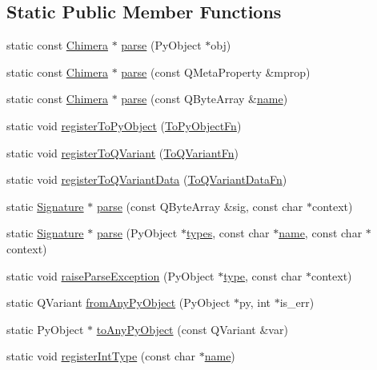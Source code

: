 \subsection*{Static Public Member Functions}
\begin{DoxyCompactItemize}
\item 
static const \hyperlink{classChimera}{Chimera} $\ast$ \hyperlink{classChimera_a9f1b5d0bca7b90c3e0cdb50c2fc9346e}{parse} (Py\+Object $\ast$obj)
\item 
static const \hyperlink{classChimera}{Chimera} $\ast$ \hyperlink{classChimera_adc43435c2b40bc5eea9d290f969beb68}{parse} (const Q\+Meta\+Property \&mprop)
\item 
static const \hyperlink{classChimera}{Chimera} $\ast$ \hyperlink{classChimera_acde081193b2c0ee1e2508b877a282ade}{parse} (const Q\+Byte\+Array \&\hyperlink{classChimera_a3f4fa9aed5e25294d82e861a451b8681}{name})
\item 
static void \hyperlink{classChimera_a452c8a5a4eaa0cdd3274368a07171e72}{register\+To\+Py\+Object} (\hyperlink{classChimera_a056918a401ce0fb2fc5f0b46a8eb6967}{To\+Py\+Object\+Fn})
\item 
static void \hyperlink{classChimera_af01d23e93c8a5a526de18489d44bfea7}{register\+To\+Q\+Variant} (\hyperlink{classChimera_aace3d67d11685db3bae5e5b2ee733cfb}{To\+Q\+Variant\+Fn})
\item 
static void \hyperlink{classChimera_aee1b6718d2efe602efd174bff6f9156a}{register\+To\+Q\+Variant\+Data} (\hyperlink{classChimera_a5c642e88eaf111610ca6e7c946bb2f7d}{To\+Q\+Variant\+Data\+Fn})
\item 
static \hyperlink{classChimera_1_1Signature}{Signature} $\ast$ \hyperlink{classChimera_a0eb16057815c922a5d5d84b38be96612}{parse} (const Q\+Byte\+Array \&sig, const char $\ast$context)
\item 
static \hyperlink{classChimera_1_1Signature}{Signature} $\ast$ \hyperlink{classChimera_a3ed6b6aec9a3483ba335acf61707823d}{parse} (Py\+Object $\ast$\hyperlink{genpromote_8cpp_ad2ab499617865b41cb4cbc84c3c55ba1}{types}, const char $\ast$\hyperlink{classChimera_a3f4fa9aed5e25294d82e861a451b8681}{name}, const char $\ast$context)
\item 
static void \hyperlink{classChimera_ade152c3f6eb88be46004de76cc2dd39f}{raise\+Parse\+Exception} (Py\+Object $\ast$\hyperlink{fftw__dct_8c_a7aead736a07eaf25623ad7bfa1f0ee2d}{type}, const char $\ast$context)
\item 
static Q\+Variant \hyperlink{classChimera_af1907d39a0f16125adeb5088a77a2e3c}{from\+Any\+Py\+Object} (Py\+Object $\ast$py, int $\ast$is\+\_\+err)
\item 
static Py\+Object $\ast$ \hyperlink{classChimera_ae9d6f0190992e38939e36b39efc35fa2}{to\+Any\+Py\+Object} (const Q\+Variant \&var)
\item 
static void \hyperlink{classChimera_a70c04ecbed7ce8b5a344b2d3364c272b}{register\+Int\+Type} (const char $\ast$\hyperlink{classChimera_a3f4fa9aed5e25294d82e861a451b8681}{name})
\end{DoxyCompactItemize}


